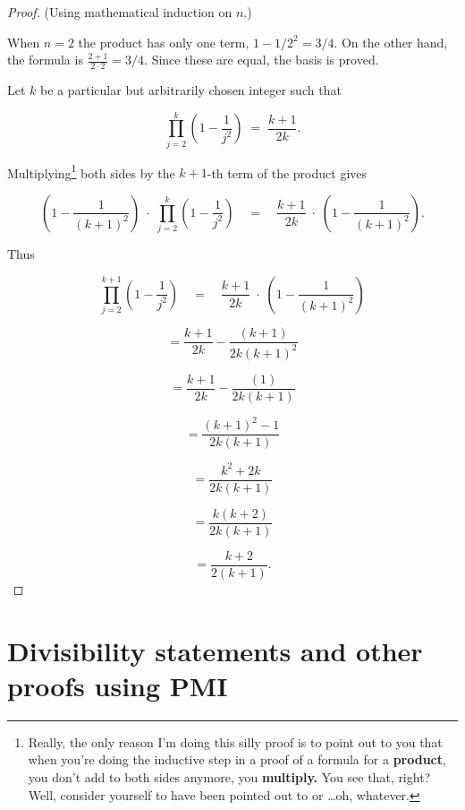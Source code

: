 \begin{proof}
(Using mathematical induction on $n$.)

 When $n = 2$ the product has only one term, $1-1/2^2 = 3/4$.
On the other hand, the formula is 
$\displaystyle \frac{2+1}{2\cdot2} = 3/4$.  Since these are equal, the 
basis is proved.


Let $k$ be a particular but arbitrarily chosen integer such that

\[ \prod_{j=2}^k \left( 1 - \frac{1}{j^2} \right) \;  = \; \frac{k+1}{2k}. \]

Multiplying\footnote{Really, the only reason I'm doing this silly proof is to 
point out to you that when you're doing the inductive step in a proof of a 
formula for a {\bf product}, you don't add to both sides anymore, you {\bf multiply.} You see that, right?  Well, consider yourself to have been pointed out to or \ldots oh, whatever.}  both sides by the $k+1$-th term of the product 
gives

\[ \left( 1 - \frac{1}{(k+1)^2} \right) \; \cdot \; \prod_{j=2}^k \left( 1 - \frac{1}{j^2} \right) \quad  = \quad \frac{k+1}{2k} \; \cdot \; \left( 1 - \frac{1}{(k+1)^2} \right). \]

Thus 

\[ \prod_{j=2}^{k+1} \left( 1 - \frac{1}{j^2} \right) \quad  = \quad \frac{k+1}{2k} \; \cdot \; \left( 1 - \frac{1}{(k+1)^2} \right) \]

\[ = \frac{k+1}{2k} - \frac{(k+1)}{2k(k+1)^2} \]

\[ = \frac{k+1}{2k} - \frac{(1)}{2k(k+1)} \]

\[ = \frac{(k+1)^2 - 1}{2k(k+1)} \]

\[ = \frac{k^2+2k}{2k(k+1)} \]

\[ = \frac{k (k+2)}{2k(k+1)} \]

\[ = \frac{k+2}{2(k+1)}. \]

\end{proof}

\newpage
  


 
\newpage

\section[Other proofs using PMI]{Divisibility statements and other proofs using PMI}
\label{sec:other_pmi}

